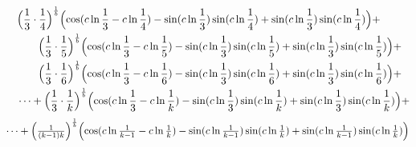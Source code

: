 \documentclass{amsart}
\begin{document}
	\[
	\begin{aligned}
		\quad & \Bigl( \frac{1}{3} \cdot \frac{1}{4} \Bigr)^\frac1b \Bigl( \cos(c \ln \frac{1}{3} - c \ln \frac{1}{4}) - \sin(c \ln \frac{1}{3}) \sin(c \ln \frac{1}{4}) + \sin(c \ln \frac{1}{3}) \sin(c \ln \frac{1}{4}) \Bigr) + \\
		& \qquad \Bigl( \frac{1}{3} \cdot \frac{1}{5} \Bigr)^\frac1b \Bigl( \cos(c \ln \frac{1}{3} - c \ln \frac{1}{5}) - \sin(c \ln \frac{1}{3}) \sin(c \ln \frac{1}{5}) + \sin(c \ln \frac{1}{3}) \sin(c \ln \frac{1}{5}) \Bigr) + \\
		& \qquad \Bigl( \frac{1}{3} \cdot \frac{1}{6} \Bigr)^\frac1b \Bigl( \cos(c \ln \frac{1}{3} - c \ln \frac{1}{6}) - \sin(c \ln \frac{1}{3}) \sin(c \ln \frac{1}{6}) + \sin(c \ln \frac{1}{3}) \sin(c \ln \frac{1}{6}) \Bigr) + \\
		& \dots  + \Bigl( \frac{1}{3} \cdot \frac{1}{k} \Bigr)^\frac1b \Bigl( \cos(c \ln \frac{1}{3} - c \ln \frac{1}{k}) - \sin(c \ln \frac{1}{3}) \sin(c \ln \frac{1}{k}) + \sin(c \ln \frac{1}{3}) \sin(c \ln \frac{1}{k}) \Bigr) + 
	\end{aligned}
	\]
	$ \dots + \Bigl( \frac{1}{(k-1)k} \Bigr)^\frac1b \Bigl( \cos(c \ln \frac{1}{k-1} - c \ln \frac{1}{k}) - \sin(c \ln \frac{1}{k-1}) \sin(c \ln \frac{1}{k}) + \sin(c \ln \frac{1}{k-1}) \sin(c \ln \frac{1}{k}) \Bigr) $
	
\end{document}
